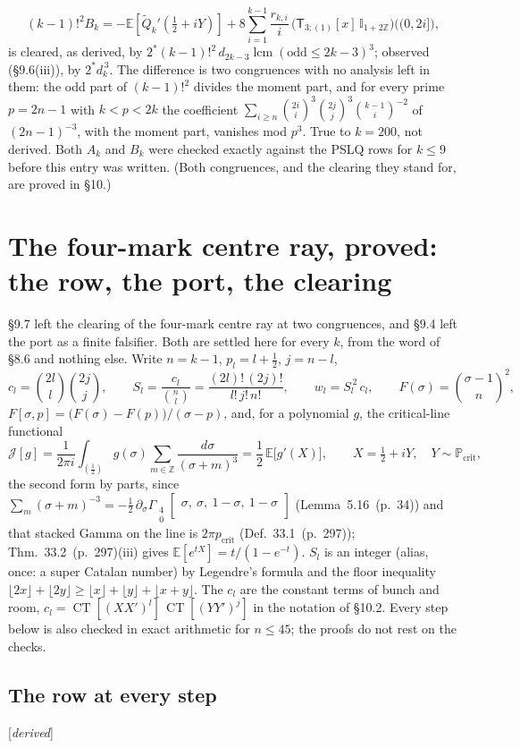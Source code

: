 \documentclass[11pt]{article}
\newcommand{\oE}{\mathbb E}
\newcommand{\sT}{\mathsf T}
\newcommand{\Gst}[4]{\Gamma_{\substack{#1\\#2}}\!\begin{bmatrix}#3\\#4\end{bmatrix}}
\newcommand{\Ilat}[1]{\mathbb I_{#1}}
\DeclareMathOperator*{\CT}{CT}
\newcommand{\status}[1]{\hfill{\small[\textit{#1}]}}
\newcommand{\hb}[2]{#1~(p.~#2)}   %
\theoremstyle{plain}
\theoremstyle{remark}
\begin{document}
\[
(k-1)!^2B_k=-\oE[\widetilde Q_k'(\tfrac12+iY)]+8\sum_{i=1}^{k-1}\frac{r_{k,i}}{i}\,\big(\sT_{3;(1)}[x]\,\Ilat{1+2\mathbb Z}\big)\big((0,2i]\big),
\]
is cleared, as derived, by $2^{\ast}(k-1)!^2\,d_{2k-3}\operatorname{lcm}(\text{odd}\le2k-3)^3$; observed (\S9.6(iii)), by $2^{\ast}d_k^{\,3}$. The difference is two congruences with no analysis left in them: the odd part of $(k-1)!^2$ divides the moment part, and for every prime $p=2n-1$ with $k<p<2k$ the coefficient $\sum_{i\ge n}\binom{2i}i^3\binom{2j}j^3\binom{k-1}i^{-2}$ of $(2n-1)^{-3}$, with the moment part, vanishes mod $p^3$. True to $k=200$, not derived. Both $A_k$ and $B_k$ were checked exactly against the PSLQ rows for $k\le9$ before this entry was written. (Both congruences, and the clearing they stand for, are proved in \S10.)

\section{The four-mark centre ray, proved: the row, the port, the clearing}

\S9.7 left the clearing of the four-mark centre ray at two congruences, and \S9.4 left the port as a finite falsifier. Both are settled here for every $k$, from the word of \S8.6 and nothing else. Write $n=k-1$, $p_l=l+\frac12$, $j=n-l$,
\[
c_l=\binom{2l}{l}\binom{2j}{j},\qquad S_l=\frac{c_l}{\binom nl}=\frac{(2l)!\,(2j)!}{l!\,j!\,n!},\qquad w_l=S_l^{\,2}\,c_l,\qquad F(\sigma)=\binom{\sigma-1}{n}^{\!2},
\]
$F[\sigma,p]=\big(F(\sigma)-F(p)\big)/(\sigma-p)$, and, for a polynomial $g$, the critical-line functional
\[
\mathcal J[g]=\frac1{2\pi i}\int_{(\frac12)}g(\sigma)\sum_{m\in\mathbb Z}\frac{d\sigma}{(\sigma+m)^3}=\frac12\,\oE\big[g'(X)\big],\qquad X=\tfrac12+iY,\quad Y\sim\mathbb P_{\mathrm{crit}},
\]
the second form by parts, since $\sum_m(\sigma+m)^{-3}=-\frac12\,\partial_\sigma\Gst40{\sigma,\ \sigma,\ 1-\sigma,\ 1-\sigma}{}$ (Lemma~\hb{5.16}{34}) and that stacked Gamma on the line is $2\pi p_{\mathrm{crit}}$ (Def.~\hb{33.1}{297}); Thm.~\hb{33.2}{297}(iii) gives $\oE[e^{tX}]=t/(1-e^{-t})$. $S_l$ is an integer (alias, once: a super Catalan number) by Legendre's formula and the floor inequality $\lfloor2x\rfloor+\lfloor2y\rfloor\ge\lfloor x\rfloor+\lfloor y\rfloor+\lfloor x+y\rfloor$. The $c_l$ are the constant terms of bunch and room, $c_l=\CT[(XX')^l]\,\CT[(YY')^{j}]$ in the notation of \S10.2. Every step below is also checked in exact arithmetic for $n\le45$; the proofs do not rest on the checks.

\subsection{The row at every step}\status{derived}
\end{document}
